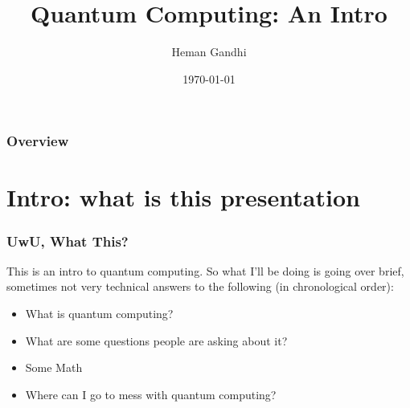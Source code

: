 \documentclass{beamer}
\title[Intro to Quantum]{Quantum Computing: An Intro} %
\author{Heman Gandhi} %
\institute[Rutgers] %
{
 Rutgers -- HackRU RnD\\ %
\medskip
\textit{hemang@ndhi.ninja} %
}
\date{\today} %
\begin{document}
\begin{frame}
\titlepage %
\end{frame}

\begin{frame}
\frametitle{Overview} %
\tableofcontents %
\end{frame}


\section{Intro: what is this presentation} %

\begin{frame}
\frametitle{UwU, What This?}
This is an intro to quantum computing.
So what I'll be doing is going over brief,
sometimes not very technical answers to the following (in chronological order):
\begin{itemize}
    \item What is quantum computing?
    \item What are some questions people are asking about it?
    \item Some Math
    \item Where can I go to mess with quantum computing?
\end{itemize}
\end{frame}
\end{document}

